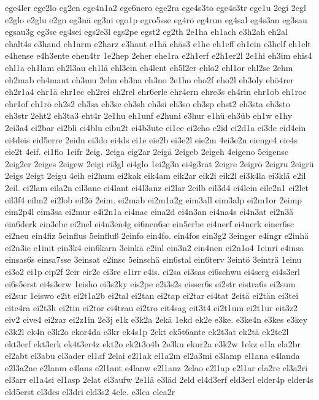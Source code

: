 {ege4ler
ege2lo
eg2en
ege4n1a2
ege6nero
ege2ra
ege4s3to
ege4s3tr
ege1u
2egi
2egl
e2glo
e2glu
e2gn
eg3nä
eg3ni
ego1p
egro5sse
eg4rö
eg4run
eg4sal
eg4s3an
eg3sau
egsau3g
eg3se
eg4sei
egs2e3l
egs2pe
egst2
eg2th
2e1ha
eh1ach
e3h2ah
eh2al
ehalt4s
e3hand
eh1arm
e2harz
e3haut
e1hä
ehäs3
e1he
eh1eff
eh1ein
e3helf
eh1elt
e4hense
e4h3ente
ehen4tr
1e2hep
2eher
ehe1ra
e2h1erf
e2h1er2l
2e1hi
eh3im
ehis4
ehl1a
eh1lam
eh2l3au
eh1lä
ehl3ein
eh4lent
eh5l2er
ehlo2
ehl1or
ehl2se
2ehm
eh2mab
eh4mant
eh3mu
2ehn
eh3na
eh3no
2e1ho
eho2f
eho2l
eh3oly
ehö4rer
eh2r1a4
ehr1ä
ehr1ec
eh2rei
eh2rel
ehr6erle
ehr4ern
ehre3s
eh4rin
ehr1ob
eh1roc
ehr1of
eh1rö
eh2s2
eh3sa
eh3se
eh3sh
eh3si
eh3so
eh3sp
ehst2
eh3sta
eh3sto
eh3str
2eht2
eh3ta3
eht4r
2e1hu
eh1unf
e2huni
e3hur
e1hü
eh3üb
eh1w
e1hy
2ei3a4
ei2bar
ei2bli
ei4blu
eibu2t
ei4b3ute
ei1ce
ei2cho
e2id
ei2d1a
ei3de
eid4ein
ei4deis
eid5erre
2eidn
ei3do
ei4ds
ei1e
eie2b
ei3e2l
eie2m
4ei3e2n
eienge4
eie4s
eie2t
4eif.
ei1flo
1eifr
2eig.
2eiga
eig2ar
2eigä
2eigeb
2eigeh
4eigeno
5eigensc
2eig2er
2eiges
2eigew
2eigi
ei3gl
ei4glo
1ei2g3n
ei4g3rat
2eigre
2eigrö
2eigru
2eigrü
2eigs
2eigt
2eigu
4eih
ei2hum
ei2kak
eik4am
eik2ar
eik2i
eik2l
ei3k4la
ei3klä
e2il
2eil.
ei2lam
eila2n
eil3ane
ei4lant
ei4l3anz
ei2lar
2eilb
eil3d4
ei4lein
eile2n1
ei2let
eil3f4
eilm2
ei2lob
eil2ö
2eim.
ei2mab
ei2m1a2g
eim3all
eim3alp
ei2m1or
2eimp
eim2p4l
eim3sa
ei2mur
e4i2n1a
ei4nac
eina2d
ei4n3an
ei4na4s
ei4n3at
ei2n3ä
ein6derk
ein3ebe
ei2nel
ei4n3en4g
ei6nen6se
ein5erbe
ei4nerf
ei4nerk
einer6sc
ei2neu
ein4fiz
5einflus
5einfluß
2einfo
ein4fo.
ein4fos
ein3g2
3einger
e4ingr
e2inhä
ei2n3ie
e1init
ein3k4
ein6karn
3einkä
e2inl
ein3n2
ein4nen
ei2n1o4
1einri
e4insa
einsas6s
einsa7sse
3einsat
e2insc
5einschä
ein6stal
ein6terv
3eintö
3einträ
1einu
ei3o2
ei1p
eip2f
2eir
eir2c
ei3re
e1irr
e4is.
ei2sa
ei3sas
ei6schwu
ei4serg
ei4s3erl
ei6s5erst
ei4s3erw
1eisho
ei3s2ky
eis2pe
e2i3s2s
eisser6s
ei2str
eistra6s
ei2sum
ei2sur
1eiswo
e2it
ei2t1a2b
ei2tal
ei2tan
ei2tap
ei2tar
ei4tat
2eitä
ei2tän
ei3tei
eite4ra
ei2t3h
ei2tin
ei2tor
ei4trau
ei2tro
eit4sag
eit3t4
ei2t1um
ei2t1ur
eit3z2
eiv2
eive4
ei2zar
ei2z1in
2e3j
e1k
e3k2a
2ekä
1ekd
ek2e
e3ke.
e3ke4n
e3kes
e3key
e3k2l
ek4n
e3k2o
ekor4da
e3kr
ek4s1p
2ekt
ek5t6ante
ek2t3at
ek2tä
ek2te2l
ekt3erf
ekt3erk
ek4t3er4z
ekt2o
ek2t3o4b
2e3ku
ekur2a
e3k2w
1ekz
e1la
ela2br
el2abt
el3abu
el3ader
el1af
2elai
e2l1ak
el1a2m
el2a3mi
e3lamp
el1ana
e4landa
e2l3a2ne
e2lanm
e4lans
e2l1ant
e4lanw
e2l1anz
2elao
e2l1ap
e2l1ar
ela2re
el3a2ri
el3arr
el1a4si
el1asp
2elat
el3aufw
2e1lä
e3läd
2eld
el4d3erf
eld3erl
elder4p
elder4s
eld5erst
el3des
el3dri
eld3s2
4ele.
e3lea
elea2r
}
